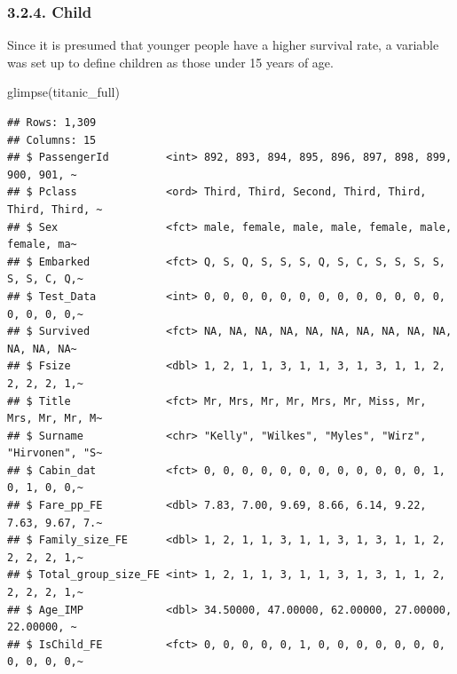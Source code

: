 \documentclass[
]{article}
\newenvironment{Shaded}{\begin{snugshade}}{\end{snugshade}}
\newcommand{\DecValTok}[1]{\textcolor[rgb]{0.00,0.00,0.81}{#1}}
\newcommand{\FunctionTok}[1]{\textcolor[rgb]{0.00,0.00,0.00}{#1}}
\newcommand{\NormalTok}[1]{#1}
\newcommand{\OtherTok}[1]{\textcolor[rgb]{0.56,0.35,0.01}{#1}}
\newcommand{\SpecialCharTok}[1]{\textcolor[rgb]{0.00,0.00,0.00}{#1}}
\begin{document}
\hypertarget{child}{%
\subsubsection{3.2.4. Child}\label{child}}

Since it is presumed that younger people have a higher survival rate, a
variable was set up to define children as those under 15 years of age.

\begin{Shaded}
\end{Shaded}

\begin{Shaded}
\begin{Highlighting}[]
\FunctionTok{glimpse}\NormalTok{(titanic\_full)}
\end{Highlighting}
\end{Shaded}

\begin{verbatim}
## Rows: 1,309
## Columns: 15
## $ PassengerId         <int> 892, 893, 894, 895, 896, 897, 898, 899, 900, 901, ~
## $ Pclass              <ord> Third, Third, Second, Third, Third, Third, Third, ~
## $ Sex                 <fct> male, female, male, male, female, male, female, ma~
## $ Embarked            <fct> Q, S, Q, S, S, S, Q, S, C, S, S, S, S, S, S, C, Q,~
## $ Test_Data           <int> 0, 0, 0, 0, 0, 0, 0, 0, 0, 0, 0, 0, 0, 0, 0, 0, 0,~
## $ Survived            <fct> NA, NA, NA, NA, NA, NA, NA, NA, NA, NA, NA, NA, NA~
## $ Fsize               <dbl> 1, 2, 1, 1, 3, 1, 1, 3, 1, 3, 1, 1, 2, 2, 2, 2, 1,~
## $ Title               <fct> Mr, Mrs, Mr, Mr, Mrs, Mr, Miss, Mr, Mrs, Mr, Mr, M~
## $ Surname             <chr> "Kelly", "Wilkes", "Myles", "Wirz", "Hirvonen", "S~
## $ Cabin_dat           <fct> 0, 0, 0, 0, 0, 0, 0, 0, 0, 0, 0, 0, 1, 0, 1, 0, 0,~
## $ Fare_pp_FE          <dbl> 7.83, 7.00, 9.69, 8.66, 6.14, 9.22, 7.63, 9.67, 7.~
## $ Family_size_FE      <dbl> 1, 2, 1, 1, 3, 1, 1, 3, 1, 3, 1, 1, 2, 2, 2, 2, 1,~
## $ Total_group_size_FE <int> 1, 2, 1, 1, 3, 1, 1, 3, 1, 3, 1, 1, 2, 2, 2, 2, 1,~
## $ Age_IMP             <dbl> 34.50000, 47.00000, 62.00000, 27.00000, 22.00000, ~
## $ IsChild_FE          <fct> 0, 0, 0, 0, 0, 1, 0, 0, 0, 0, 0, 0, 0, 0, 0, 0, 0,~
\end{verbatim}
\end{document}
